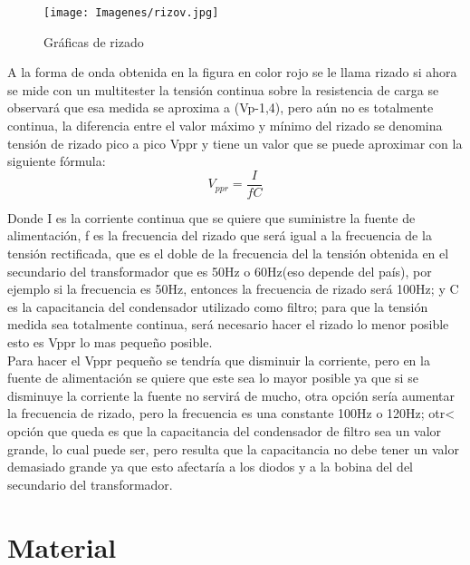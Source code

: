 \documentclass{article}
\begin{document}
\begin{figure}[h!]
    \centering
    \texttt{[image: Imagenes/rizov.jpg]}
    \caption{Gráficas de rizado}
    \label{fig:rizado}
\end{figure}

 
A la forma de onda obtenida en la figura en color rojo se le llama rizado si ahora se mide con un multitester la tensión continua sobre la resistencia de carga se observará que esa medida se aproxima a (Vp-1,4), pero aún no es totalmente continua, la diferencia entre el valor máximo y mínimo del rizado se denomina tensión de rizado pico a pico Vppr y tiene un valor que se puede aproximar con la siguiente fórmula:\citep{FiltroParaCorrienteAlterna}\\

\begin{equation}
    V_{ppr}=\frac{I}{fC}
\end{equation}

Donde I es la corriente continua que se quiere que suministre la fuente de alimentación, f es la frecuencia del rizado que será igual a la frecuencia de la tensión rectificada, que es el doble de la frecuencia del la tensión obtenida en el secundario del transformador que es 50Hz o 60Hz(eso depende del país), por ejemplo si la frecuencia es 50Hz, entonces la frecuencia de rizado será 100Hz; y C es la capacitancia del condensador utilizado como filtro; para que la tensión medida sea totalmente continua, será necesario hacer el rizado lo menor posible esto es  Vppr lo mas pequeño posible.\citep{FiltroParaCorrienteAlterna}\\

Para hacer el Vppr pequeño se tendría que disminuir la corriente, pero en la fuente de alimentación se quiere que este sea lo mayor posible ya que si se disminuye la corriente la fuente no servirá de mucho, otra opción sería aumentar la frecuencia de rizado, pero la frecuencia es una constante 100Hz o 120Hz; otr< opción que queda es que la capacitancia del condensador de filtro sea un valor grande, lo  cual puede ser, pero resulta que la capacitancia no debe tener un valor demasiado grande ya que esto afectaría a los diodos y a la bobina del del secundario del transformador.\citep{FiltroParaCorrienteAlterna}



 
 \section{Material}
\end{document}
